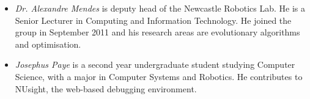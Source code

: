 \documentclass{llncs}
\begin{document}
\begin{itemize}










\item \emph{Dr. Alexandre Mendes} is deputy head of the Newcastle Robotics Lab. He is a Senior Lecturer in Computing and Information Technology. He joined the group in September 2011 and his research areas are evolutionary algorithms and optimisation.

\item \emph{Josephus Paye} is a second year undergraduate student studying Computer Science, with a major in Computer Systems and Robotics. He contributes to NUsight, the web-based debugging environment.


\end{itemize}
\end{document}
